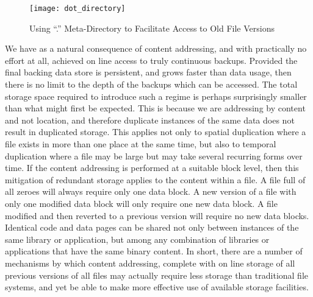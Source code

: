 \documentclass[british,english]{article}
\begin{document}
\begin{figure}
\begin{centering}
\texttt{[image: dot\_directory]}
\par\end{centering}


\caption{\label{cap:Using-.-Meta-Directory-for-history}Using {}``.'' Meta-Directory
to Facilitate Access to Old File Versions}
\end{figure}


We have as a natural consequence of content addressing, and with practically
no effort at all, achieved on line access to truly continuous backups.
Provided the final backing data store is persistent, and grows faster
than data usage, then there is no limit to the depth of the backups
which can be accessed. The total storage space required to introduce
such a regime is perhaps surprisingly smaller than what might first
be expected. This is because we are addressing by content and not
location, and therefore duplicate instances of the same data does
not result in duplicated storage. This applies not only to spatial
duplication where a file exists in more than one place at the same
time, but also to temporal duplication where a file may be large but
may take several recurring forms over time. If the content addressing
is performed at a suitable block level, then this mitigation of redundant
storage applies to the content within a file. A file full of all zeroes
will always require only one data block. A new version of a file with
only one modified data block will only require one new data block.
A file modified and then reverted to a previous version will require
no new data blocks. Identical code and data pages can be shared not
only between instances of the same library or application, but among
any combination of libraries or applications that have the same binary
content. In short, there are a number of mechanisms by which content
addressing, complete with on line storage of all previous versions
of all files may actually require less storage than traditional file
systems, and yet be able to make more effective use of available storage
facilities. 
\end{document}
